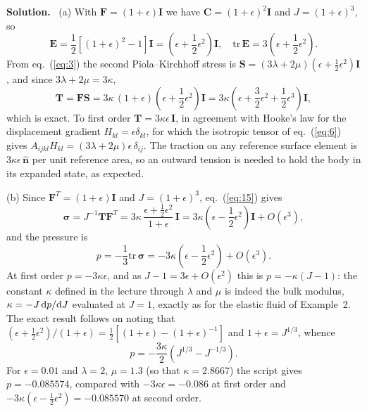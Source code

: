 \documentclass[a4paper,12pt]{paper}
\newenvironment{solution}{\par\noindent\textbf{Solution.}\ }{\par\medskip}
\begin{document}
\begin{solution}
(a) With $\mathbf{F}=(1+\epsilon)\mathbf{I}$ we have $\mathbf{C}=(1+\epsilon)^{2}\mathbf{I}$ and
$J=(1+\epsilon)^{3}$, so
\begin{equation}
\mathbf{E}=\frac{1}{2}\left[(1+\epsilon)^{2}-1\right]\mathbf{I}=\left(\epsilon+\frac{1}{2}\epsilon^{2}\right)\mathbf{I},\quad
\mathrm{tr}\,\mathbf{E}=3\left(\epsilon+\frac{1}{2}\epsilon^{2}\right).
\label{eq:37}
\end{equation}
From eq.~(\ref{eq:3}) the second Piola--Kirchhoff stress is
$\mathbf{S}=(3\lambda+2\mu)(\epsilon+\frac{1}{2}\epsilon^{2})\mathbf{I}$, and since $3\lambda+2\mu=3\kappa$,
\begin{equation}
\mathbf{T}=\mathbf{F}\mathbf{S}=3\kappa\,(1+\epsilon)\left(\epsilon+\frac{1}{2}\epsilon^{2}\right)\mathbf{I}
=3\kappa\left(\epsilon+\frac{3}{2}\epsilon^{2}+\frac{1}{2}\epsilon^{3}\right)\mathbf{I},
\label{eq:38}
\end{equation}
which is exact. To first order $\mathbf{T}=3\kappa\epsilon\,\mathbf{I}$, in agreement with Hooke's
law for the displacement gradient $H_{kl}=\epsilon\delta_{kl}$, for which the isotropic tensor of
eq.~(\ref{eq:6}) gives $A_{ijkl}H_{kl}=(3\lambda+2\mu)\epsilon\,\delta_{ij}$. The traction on any
reference surface element is $3\kappa\epsilon\,\hat{\mathbf{n}}$ per unit reference area, so an
outward tension is needed to hold the body in its expanded state, as expected.

(b) Since $\mathbf{F}^{T}=(1+\epsilon)\mathbf{I}$ and $J=(1+\epsilon)^{3}$, eq.~(\ref{eq:15}) gives
\begin{equation}
\bm{\sigma}=J^{-1}\mathbf{T}\mathbf{F}^{T}=3\kappa\,\frac{\epsilon+\frac{1}{2}\epsilon^{2}}{1+\epsilon}\,\mathbf{I}
=3\kappa\left(\epsilon-\frac{1}{2}\epsilon^{2}\right)\mathbf{I}+O(\epsilon^{3}),
\label{eq:39}
\end{equation}
and the pressure is
\begin{equation}
p=-\frac{1}{3}\mathrm{tr}\,\bm{\sigma}=-3\kappa\left(\epsilon-\frac{1}{2}\epsilon^{2}\right)+O(\epsilon^{3}).
\label{eq:40}
\end{equation}
At first order $p=-3\kappa\epsilon$, and as $J-1=3\epsilon+O(\epsilon^{2})$ this is $p=-\kappa(J-1)$:
the constant $\kappa$ defined in the lecture through $\lambda$ and $\mu$ is indeed the bulk
modulus, $\kappa=-J\,\mathrm{d} p/\mathrm{d} J$ evaluated at $J=1$, exactly as for the elastic fluid of
Example~2. The exact result follows on noting that
$(\epsilon+\frac{1}{2}\epsilon^{2})/(1+\epsilon)=\frac{1}{2}\left[(1+\epsilon)-(1+\epsilon)^{-1}\right]$ and
$1+\epsilon=J^{1/3}$, whence
\begin{equation}
p=-\frac{3\kappa}{2}\left(J^{1/3}-J^{-1/3}\right).
\label{eq:41}
\end{equation}
For $\epsilon=0.01$ and $\lambda=2$, $\mu=1.3$ (so that $\kappa=2.8667$) the script gives
$p=-0.085574$, compared with $-3\kappa\epsilon=-0.086$ at first order and
$-3\kappa(\epsilon-\frac{1}{2}\epsilon^{2})=-0.085570$ at second order.


\end{solution}
\end{document}
